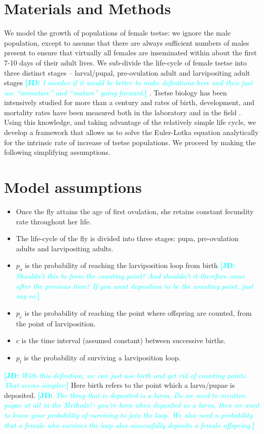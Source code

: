 \documentclass[12pt,a4paper]{article}
\newcommand{\comment}[3]{\textcolor{#1}{\textbf{[#2: }\textsl{#3}\textbf{]}}}
\newcommand{\jd}[1]{\comment{cyan}{JD}{#1}}
\begin{document}
\section*{Materials and Methods}
We model the growth of populations of female tsetse: we ignore the male population, except to assume that there are always sufficient numbers of males present to ensure that virtually all females are inseminated within about the first 7-10 days of their adult lives. We sub-divide the life-cycle of female tsetse into three distinct stages – larval/pupal, pre-ovulation adult and larvipositing adult stages \jd{I wonder if it would be better to make definitions here and then just use ``immature'' and ``mature'' going forward.} . Tsetse biology has been intensively studied for more than a century and rates of birth, development, and mortality rates have been measured both  in  the laboratory and  in the field \cite{Rogers2011,Hargrove2004a,Jarry2007,Hargrove2011,Hargrove2019a}. Using this knowledge, and taking advantage of the relatively simple life cycle, we develop a framework that allows us to solve the Euler-Lotka equation analytically for the intrinsic rate of increase of tsetse populations. We proceed by making the following simplifying assumptions.
\section*{Model assumptions} 
\begin{itemize} 
	\item  Once the fly attains the age of first ovulation, she retains constant fecundity rate throughout her life.   
	\item The life-cycle of the fly is divided into three stages: pupa, pre-ovulation adults and larvipositing adults. 
	\item  $p_o$ is the probability of reaching the larviposition loop from birth \jd{Shouldn't this be from the counting point? And shouldn't it therefore come after the previous item? If you want deposition to be the counting point, just say so.}
	\item   $p_c$ is the probability of reaching the point where offspring are counted, from the point of larviposition.
	\item   $c$ is the time interval (assumed constant) between successive births. 
	\item   $p_l$ is the probability of surviving a larviposition loop.
\end{itemize}
\jd{With this definition, we can just use birth and get rid of counting points. That seems simpler:} Here birth refers to the point which a larva/pupae is deposited. \jd{The thing that is deposited is a larva. Do we need to mention pupae at all in the Methods?: you're born when deposited as a larva, then we want to know your probability of surviving to join the loop. We also need a probability that a female who survives the loop also successfully deposits a female offspring.}
\end{document}
